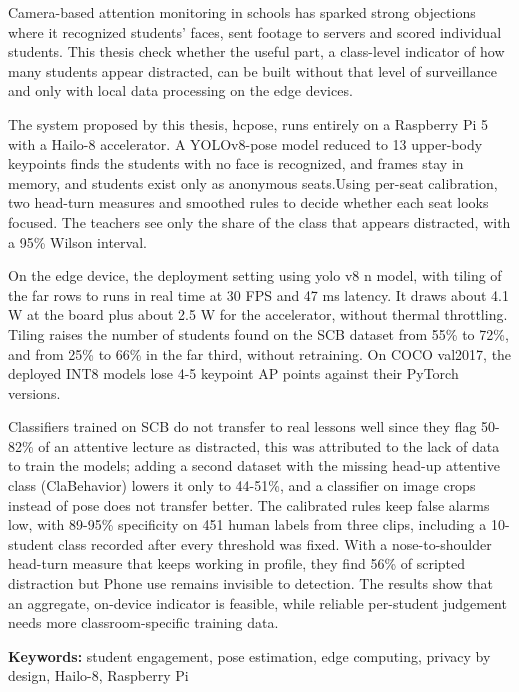 Camera-based attention monitoring in schools has sparked strong objections where it recognized students' faces, sent footage to servers and scored individual students. This thesis check whether the useful part, a class-level indicator of how many students appear distracted, can be built without that level of surveillance and only with local data processing on the edge devices.

The system proposed by this thesis, hcpose, runs entirely on a Raspberry Pi 5 with a Hailo-8 accelerator. A YOLOv8-pose model reduced to 13 upper-body keypoints finds the students with no face is recognized, and frames stay in memory, and students exist only as anonymous seats.Using per-seat calibration, two head-turn measures and smoothed rules to decide whether each seat looks focused. The teachers see only the share of the class that appears distracted, with a 95\% Wilson interval.

On the edge device, the deployment setting using yolo v8 n model, with tiling of the far rows to runs in real time at 30 FPS and 47 ms latency. It draws about 4.1 W at the board plus about 2.5 W for the accelerator, without thermal throttling. Tiling raises the number of students found on the SCB dataset from 55\% to 72\%, and from 25\% to 66\% in the far third, without retraining. On COCO val2017, the deployed INT8 models lose 4-5 keypoint AP points against their PyTorch versions.

Classifiers trained on SCB do not transfer to real lessons well since they flag 50-82\% of an attentive lecture as distracted, this was attributed to the lack of data to train the models; adding a second dataset with the missing head-up attentive class (ClaBehavior) lowers it only to 44-51\%, and a classifier on image crops instead of pose does not transfer better. The calibrated rules keep false alarms low, with 89-95\% specificity on 451 human labels from three clips, including a 10-student class recorded after every threshold was fixed. With a nose-to-shoulder head-turn measure that keeps working in profile, they find 56\% of scripted distraction but Phone use remains invisible to detection. The results show that an aggregate, on-device indicator is feasible, while reliable per-student judgement needs more classroom-specific training data.

\textbf{Keywords:} student engagement, pose estimation, edge computing, privacy by design, Hailo-8, Raspberry Pi
